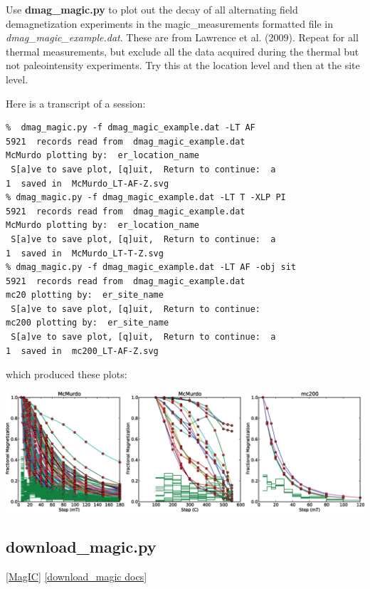 \documentclass[11pt]{book}
\begin{document}
{{Use {\bf dmag\_magic.py} to plot out the decay of all alternating field demagnetization experiments in the magic\_measurements
formatted file in {\it dmag\_magic\_example.dat}.   These are from Lawrence et al. (2009). \nocite{lawrence09}  Repeat for all thermal measurements, but exclude all the data acquired during the thermal but not  paleointensity experiments.   Try this at the location level and then at the site level.

Here is a transcript of a session:

\begin{verbatim}
%  dmag_magic.py -f dmag_magic_example.dat -LT AF
5921  records read from  dmag_magic_example.dat
McMurdo plotting by:  er_location_name
 S[a]ve to save plot, [q]uit,  Return to continue:  a
1  saved in  McMurdo_LT-AF-Z.svg
% dmag_magic.py -f dmag_magic_example.dat -LT T -XLP PI
5921  records read from  dmag_magic_example.dat
McMurdo plotting by:  er_location_name
 S[a]ve to save plot, [q]uit,  Return to continue:  a
1  saved in  McMurdo_LT-T-Z.svg
% dmag_magic.py -f dmag_magic_example.dat -LT AF -obj sit
5921  records read from  dmag_magic_example.dat
mc20 plotting by:  er_site_name
 S[a]ve to save plot, [q]uit,  Return to continue:
mc200 plotting by:  er_site_name
 S[a]ve to save plot, [q]uit,  Return to continue:  a
1  saved in  mc200_LT-AF-Z.svg

\end{verbatim}

\noindent which produced these plots:

\includegraphics[width=15cm]{EPSfiles/dmag.eps}

 \subsection{download\_magic.py} [\href{http://earthref.org/MagIC}{MagIC}]
\href{https://github.com/PmagPy/PmagPy/blob/master/programs/download_magic.py}{[download\_magic docs]}

}}
\end{document}

